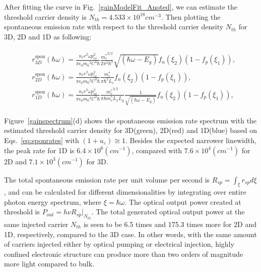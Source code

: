 After fitting the curve in Fig.~\ref{gainModelFit_Anoted}, we can estimate the
threshold carrier density is $N_{th} = 4.533\times10^{18} cm^{-3}$. Then
plotting the spontaneous emission rate with respect to the threshold carrier
density $N_{th}$ for 3D, 2D and 1D as following:

\begin{eqnarray}
\begin{aligned}
& r_{3D}^{\mathrm{spon}}(\hbar\omega)=\frac{n_re^2\omega{p_{cv}^2}}{{\pi}\epsilon_0{m_0}^2C^3{\hbar}}\frac{{m_r^\ast}^{3/2}}{2\pi^2\hbar^3}{\sqrt{(\hbar\omega-E_g)}}f_n(\xi_2)(1-f_p(\xi_1)),
\\
& r_{2D}^{\mathrm{spon}}(\hbar\omega)=\frac{n_re^2\omega{p_{cv}^2}}{{\pi}\epsilon_0{m_0}^2C^3{\hbar}}\frac{{m_r^\ast}}{\pi\hbar^2L_z}f_n(\xi_2)(1-f_p(\xi_1)),
\\
& r_{1D}^{\mathrm{spon}}(\hbar\omega)=\frac{n_re^2\omega{p_{cv}^2}}{{\pi}\epsilon_0{m_0}^2C^3{\hbar}}\frac{{m_r^\ast}^{3/2}}{\pi\hbar{m_e^\ast}L_xL_y}\frac{1}{\sqrt{(\hbar\omega-E_g)}}f_n(\xi_2)(1-f_p(\xi_1)),
\end{aligned}
\label{eq:sponrates}
\end{eqnarray}

Figure~\ref{gainspectrum}(d) shows the spontaneous emission rate spectrum with
the estimated threshold carrier density for 3D(green), 2D(red) and 1D(blue)
based on Eqs.~\ref{eq:sponrates} with $(1+u_\varepsilon)\cong{1}$. Besides the
expected narrower linewidth, the peak rate for 1D is $6.4\times10^{6}
(cm^{-1})$, compared with $7.6\times10^{4} (cm^{-1})$ for 2D and
$7.1\times10^{3} (cm^{-1})$ for 3D.

The total spontaneous emission rate per unit volume per second is $R_{sp} =
\int_{\xi}r_{sp}d{\xi}$, and can be calculated for different dimensionalities
by integrating over entire photon energy spectrum, where $\xi=\hbar\omega$.
The optical output power created at threshold is $P_{out}=
h{\nu}{R_{sp}}|_{N_{th}}$.  The total generated optical output power at the
same injected carrier $N_{th}$ is seen to be 6.5 times and 175.3 times more for
2D and 1D, respectively, compared to the 3D case. In other words, with the same
amount of carriers injected either by optical pumping or electrical injection,
highly confined electronic structure can produce more than two orders of
magnitude more light compared to bulk.


